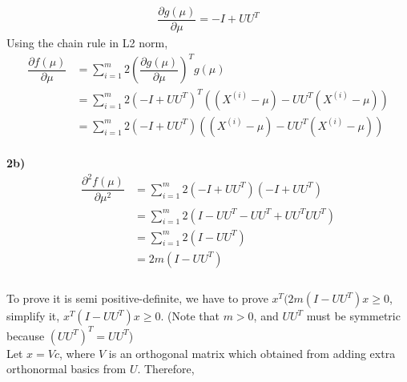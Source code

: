 \documentclass[12pt]{article}
\begin{document}
\begin{align*}
\dfrac{\partial g(\mu)}{\partial \mu} = -I + UU^{T}
\end{align*}
Using the chain rule in L2 norm,
\begin{align*}
\dfrac{\partial f(\mu)}{\partial \mu} &= \sum_{i=1}^{m}2(\dfrac{\partial g(\mu)}{\partial \mu})^{T}g(\mu)\\
&= \sum_{i=1}^{m}2(-I + UU^{T})^{T}((X^{(i)} - \mu ) - UU^{T}(X^{(i)} - \mu ))\\
&= \sum_{i=1}^{m}2(-I + UU^{T})((X^{(i)} - \mu ) - UU^{T}(X^{(i)} - \mu ))
\end{align*}\\
\textbf{2b)}\\
\begin{align*}
\dfrac{\partial^{2}f(\mu)}{\partial \mu^{2}} &= \sum_{i=1}^{m} 2(-I + UU^{T})(-I + UU^{T})\\
&= \sum_{i=1}^{m} 2(I - UU^{T} - UU^{T} + UU^{T}UU^{T})\\
&= \sum_{i=1}^{m} 2(I - UU^{T})\\
&= 2m(I-UU^{T})\\
\end{align*}\\
To prove it is semi positive-definite, we have to prove $x^{T}(2m(I-UU^{T})x \geq 0$, simplify it, $x^{T}(I-UU^{T})x \geq 0$. (Note that $m > 0$, and $UU^{T}$ must be symmetric because $(UU^{T})^{T} = UU^{T}$)\\
Let $x = Vc$, where $V$ is an orthogonal matrix which obtained from adding extra orthonormal basics from $U$. Therefore,\\
\end{document}
